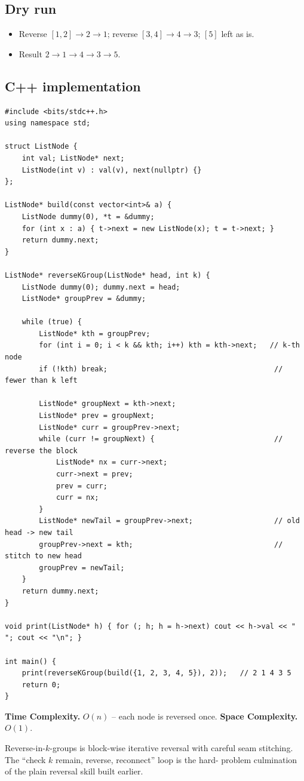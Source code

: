 \subsection*{Dry run}


\begin{itemize}
  \item Reverse $[1,2]\to2\to1$; reverse $[3,4]\to4\to3$; $[5]$ left as is.
  \item Result $2\to1\to4\to3\to5$.
\end{itemize}

\subsection*{C++ implementation}

\begin{lstlisting}
#include <bits/stdc++.h>
using namespace std;

struct ListNode {
    int val; ListNode* next;
    ListNode(int v) : val(v), next(nullptr) {}
};

ListNode* build(const vector<int>& a) {
    ListNode dummy(0), *t = &dummy;
    for (int x : a) { t->next = new ListNode(x); t = t->next; }
    return dummy.next;
}

ListNode* reverseKGroup(ListNode* head, int k) {
    ListNode dummy(0); dummy.next = head;
    ListNode* groupPrev = &dummy;

    while (true) {
        ListNode* kth = groupPrev;
        for (int i = 0; i < k && kth; i++) kth = kth->next;   // k-th node
        if (!kth) break;                                       // fewer than k left

        ListNode* groupNext = kth->next;
        ListNode* prev = groupNext;
        ListNode* curr = groupPrev->next;
        while (curr != groupNext) {                            // reverse the block
            ListNode* nx = curr->next;
            curr->next = prev;
            prev = curr;
            curr = nx;
        }
        ListNode* newTail = groupPrev->next;                   // old head -> new tail
        groupPrev->next = kth;                                 // stitch to new head
        groupPrev = newTail;
    }
    return dummy.next;
}

void print(ListNode* h) { for (; h; h = h->next) cout << h->val << " "; cout << "\n"; }

int main() {
    print(reverseKGroup(build({1, 2, 3, 4, 5}), 2));   // 2 1 4 3 5
    return 0;
}
\end{lstlisting}

\begin{complexitybox}
\textbf{Time Complexity.} $O(n)$ -- each node is reversed once.
\textbf{Space Complexity.} $O(1)$.
\end{complexitybox}

\begin{takeawaybox}
Reverse-in-$k$-groups is block-wise iterative reversal with careful seam
stitching. The ``check $k$ remain, reverse, reconnect'' loop is the hard-
problem culmination of the plain reversal skill built earlier.
\end{takeawaybox}
